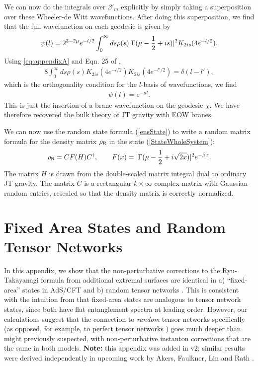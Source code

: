 \documentclass[12pt]{article}
\newcommand{\be}{\begin{equation}}
\newcommand{\ee}{\end{equation}}
\numberwithin{equation}{section}
\begin{document}
We can now do the integrals over $\beta'_m$ explicitly by simply taking a superposition over these Wheeler-de Witt wavefunctions. After doing this superposition, we find that the full wavefunction on each geodesic is given by
\begin{align}
\psi (l) = 2^{3 - 2 \mu} e^{-l/2} \int_0^\infty ds \rho(s) |\Gamma(\mu-{1\over 2}+is)|^2 K_{2 is } (4 e^{-l/2}).
\end{align}
Using \eqref{eq:appendixA} and Eqn. 25 of \cite{yakubovich2013use},
\begin{align}
8 \int_0^\infty ds\rho(s) K_{2is}(4e^{-l/2}) K_{2is}(4e^{-l'/2}) = \delta(l - l'),
\end{align}
 which is the orthogonality condition for the $l$-basis of wavefunctions, we find
\begin{align}
\psi (l) = e^{- \mu l }.
\end{align}
This is just the insertion of a brane wavefunction on the geodesic $\chi$. We have therefore recovered the bulk theory of JT gravity with EOW branes.

We can now use the random state formula (\ref{ensState}) to write a random matrix formula for the density matrix $\rho_{\sf{R}}$ in the state (\ref{StateWholeSystem}):
\be
\rho_{\sf{R}} = C F(H)C^\dagger, \hspace{20pt} F(x) = |\Gamma(\mu-\frac{1}{2}+i\sqrt{2x})|^2e^{-\beta x}.
\ee
The matrix $H$ is drawn from the double-scaled matrix integral dual to ordinary JT gravity. The matrix $C$ is a rectangular $k\times \infty$ complex matrix with Gaussian random entries, rescaled so that the density matrix is correctly normalized.

\section{Fixed Area States and Random Tensor Networks}
In this appendix, we show that the non-perturbative corrections to the Ryu-Takayanagi formula from additional extremal surfaces are identical in a) ``fixed-area'' states in AdS/CFT \cite{Akers:2018fow,Dong:2018seb} and b) random tensor networks \cite{Hayden:2016cfa}. This is consistent with the intuition from  \cite{Akers:2018fow,Dong:2018seb} that fixed-area states are analogous to tensor network states, since both have flat entanglement spectra at leading order. However, our calculations suggest that the connection to \emph{random} tensor networks specifically (as opposed, for example, to perfect tensor networks \cite{Pastawski:2015qua}) goes much deeper than might previously suspected, with non-perturbative instanton corrections that are the same in both models. {\bf Note: } this appendix was added in v2; similar results were derived independently in upcoming work by Akers, Faulkner, Lin and Rath \cite{AFLR}.
\end{document}
